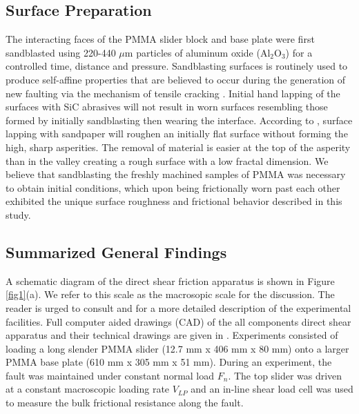 \documentclass[draft]{agujournal2019}
\begin{document}
\subsection{Surface Preparation}
\label{Surface preparation}
The interacting faces of the PMMA slider block and base plate were first sandblasted using 220-440 $\mu$m particles of aluminum oxide (Al$_2$O$_3$) for a controlled time, distance and pressure.  Sandblasting surfaces is routinely used to produce self-affine properties that are believed to occur during the generation of new faulting via the mechanism of tensile cracking \cite{Power1991, Schmittbuhl2006, Persson2014}.  Initial hand lapping of the surfaces with SiC abrasives \cite{Dieterich1994} will not result in worn surfaces resembling those formed by initially sandblasting then wearing the interface. According to , surface lapping with sandpaper will roughen an initially flat surface without forming the high, sharp asperities.  The removal of material is easier at the top of the asperity than in the valley creating a rough surface with a low fractal dimension.  We believe that sandblasting the freshly machined samples of PMMA was necessary to obtain initial conditions, which upon being frictionally worn past each other exhibited the unique surface roughness and frictional behavior described in this study.

\subsection{Summarized General Findings}
\label{GeneralExp}

 A schematic diagram of the direct shear friction apparatus is shown in Figure \ref{fig1}(a). We refer to this scale as the macrosopic scale for the discussion. The reader is urged to consult  and  for a more detailed description of the experimental facilities. Full computer aided drawings (CAD) of the all components direct shear apparatus and their technical drawings are given in . Experiments consisted of loading a long slender PMMA slider (12.7 mm x 406 mm x 80 mm) onto a larger PMMA base plate (610 mm x 305 mm x 51 mm). During an experiment, the fault was maintained under constant normal load $F_{n}$.  The top slider was driven at a constant macroscopic loading rate $V_{LP}$ and an in-line shear load cell was used to measure the bulk frictional resistance along the fault.  
 
\end{document}
